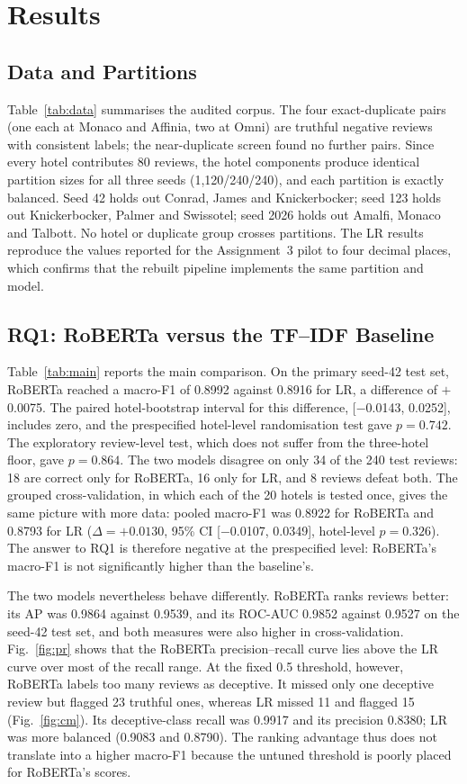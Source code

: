 \section{Results}
\label{sec:results}


\subsection{Data and Partitions}
Table~\ref{tab:data} summarises the audited corpus. The four exact-duplicate pairs (one each at Monaco and Affinia, two at Omni) are truthful negative reviews with consistent labels; the near-duplicate screen found no further pairs. Since every hotel contributes 80 reviews, the hotel components produce identical partition sizes for all three seeds (1,120/240/240), and each partition is exactly balanced. Seed 42 holds out Conrad, James and Knickerbocker; seed 123 holds out Knickerbocker, Palmer and Swissotel; seed 2026 holds out Amalfi, Monaco and Talbott. No hotel or duplicate group crosses partitions. The LR results reproduce the values reported for the Assignment~3 pilot to four decimal places, which confirms that the rebuilt pipeline implements the same partition and model.

\subsection{RQ1: RoBERTa versus the TF--IDF Baseline}
Table~\ref{tab:main} reports the main comparison. On the primary seed-42 test set, RoBERTa reached a macro-F1 of 0.8992 against 0.8916 for LR, a difference of $+$0.0075. The paired hotel-bootstrap interval for this difference, [$-$0.0143, 0.0252], includes zero, and the prespecified hotel-level randomisation test gave $p=0.742$. The exploratory review-level test, which does not suffer from the three-hotel floor, gave $p=0.864$. The two models disagree on only 34 of the 240 test reviews: 18 are correct only for RoBERTa, 16 only for LR, and 8 reviews defeat both. The grouped cross-validation, in which each of the 20 hotels is tested once, gives the same picture with more data: pooled macro-F1 was 0.8922 for RoBERTa and 0.8793 for LR ($\Delta=+0.0130$, 95\% CI [$-$0.0107, 0.0349], hotel-level $p=0.326$). The answer to RQ1 is therefore negative at the prespecified level: RoBERTa's macro-F1 is not significantly higher than the baseline's.

The two models nevertheless behave differently. RoBERTa ranks reviews better: its AP was 0.9864 against 0.9539, and its ROC-AUC 0.9852 against 0.9527 on the seed-42 test set, and both measures were also higher in cross-validation. Fig.~\ref{fig:pr} shows that the RoBERTa precision--recall curve lies above the LR curve over most of the recall range. At the fixed 0.5 threshold, however, RoBERTa labels too many reviews as deceptive. It missed only one deceptive review but flagged 23 truthful ones, whereas LR missed 11 and flagged 15 (Fig.~\ref{fig:cm}). Its deceptive-class recall was 0.9917 and its precision 0.8380; LR was more balanced (0.9083 and 0.8790). The ranking advantage thus does not translate into a higher macro-F1 because the untuned threshold is poorly placed for RoBERTa's scores.

